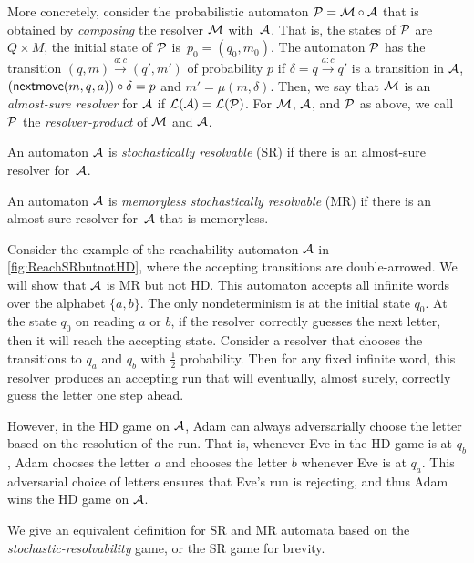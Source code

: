More concretely, consider the probabilistic automaton $\mathcal{P}=\mathcal{M}\circ\mathcal{A}$ that is obtained by \emph{composing} the resolver $\mathcal{M}$ with~$\mathcal{A}$. That is, the states of $\mathcal{P}$ are $Q \times M$, the initial state of $\mathcal{P}$ is~$p_0=(q_0,m_0)$. The automaton $\mathcal{P}$ has the transition $(q,m)\xrightarrow{a:c}(q',m')$ of probability $p$ if $\delta=q\xrightarrow{a:c}q'$ is a transition in $\mathcal{A}$, $({\mathsf{nextmove}}(m,q,a))\circ \delta = p$ and $m'=\mu(m,\delta)$. Then, we say that $\mathcal{M}$ is an \emph{almost-sure resolver} for $\mathcal{A}$  if $\mathcal{L}(\mathcal{A})=\mathcal{L}(\mathcal{P})$. For $\mathcal{M}$, $\mathcal{A}$, and $\mathcal{P}$ as above, we call $\mathcal{P}$ the \emph{resolver-product} of $\mathcal{M}$ and $\mathcal{A}$.   

\begin{tcolorbox}
   An automaton $\mathcal{A}$ is \emph{stochastically resolvable} (SR) if there is an almost-sure resolver for~$\mathcal{A}$.
\end{tcolorbox}
\begin{tcolorbox}
   An automaton $\mathcal{A}$ is \emph{memoryless stochastically resolvable} (MR) if there is an almost-sure resolver for~$\mathcal{A}$ that is memoryless.  
\end{tcolorbox}





\begin{example}\label{example:reachSRbutnotHD}
Consider the example of the reachability automaton $\mathcal{A}$ in \cref{fig:ReachSRbutnotHD}, where the accepting transitions are double-arrowed. We will show that $\mathcal{A}$ is MR but not HD. This automaton accepts all infinite words over the alphabet $\{a,b\}$. The only nondeterminism is at the initial state $q_0$.  At the state $q_0$ on reading $a$ or $b$,  if the resolver correctly guesses the next letter, then it will reach the accepting state. Consider a resolver that chooses the transitions to $q_a$ and $q_b$ with $\frac{1}{2}$ probability. Then for any fixed infinite word, this resolver produces an accepting run that will eventually, almost surely,  correctly guess the letter one step ahead.

However, in the HD game on $\mathcal{A}$, Adam can always adversarially choose the letter based on the resolution of the run. That is, whenever Eve in the HD game is at $q_b$, Adam chooses the letter $a$ and chooses the letter $b$ whenever Eve is at $q_a$. This adversarial choice of letters ensures that Eve's run is rejecting, and thus Adam wins the HD game on $\mathcal{A}$.
\end{example}
We give an equivalent definition for SR and MR automata based on the \emph{stochastic-resolvability} game, or the SR game for brevity. 
